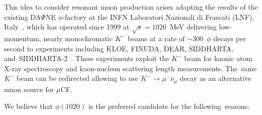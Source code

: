 \documentclass[particles,article,accept,pdftex,moreauthors]{Definitions/mdpi}
\begin{document}
This idea to consider resonant muon production arises adapting the results of the existing DA$\Phi$NE $\phi$-factory at the INFN Laboratori Nazionali di Frascati (LNF), \mbox{Italy~\cite{Vignola:1994DAFNE,Zobov:2007xw},} which has operated since 1999 at $\sqrt{s}=1020$~MeV delivering low-momentum, nearly monochromatic $K^-$ beams at a rate of $\sim$300~$\phi$ decays per second to experiments including KLOE, FINUDA, DEAR, SIDDHARTA, and~SIDDHARTA-2~\cite{Sirghi:2023wok,Iliescu:2016zgx}. These experiments exploit the $K^-$ beam for kaonic atom X-ray spectroscopy and kaon-nucleon scattering length measurements. The~same $K^-$ beam can be redirected allowing to use $K^-\to\mu^-\bar\nu_\mu$ decay as an alternative muon source for $\mu$CF.

We believe that $\phi(1020)$ is the preferred candidate for the following~reasons:
\end{document}
